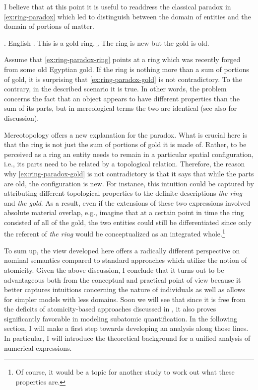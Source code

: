 	I believe that at this point it is useful to readdress the classical paradox in \ref{ex:ring-paradox} which led \citeauthor{link1983logical} to distinguish between the domain of entities and the domain of portions of matter.
	
	\ex. English \citep[adapted]{link1983logical}\label{ex:ring-paradox}
	\a. This is a gold ring.\label{ex:ring-paradox-ring}
	\b. The ring is new but the gold is old.\label{ex:ring-paradox-gold}
	
	 Assume that \ref{ex:ring-paradox-ring} points at a ring which was recently forged from some old Egyptian gold. If the ring is nothing more than a sum of portions of gold, it is surprising that \ref{ex:ring-paradox-gold} is not contradictory. To the contrary, in the described scenario it is true. In other words, the problem concerns the fact that an object appears to have different properties than the sum of its parts, but in mereological terms the two are identical (see also \citealt{rothstein2010counting,rothstein2017semantics} for discussion).
	
	Mereotopology offers a new explanation for the paradox. What is crucial here is that the ring is not just the sum of portions of gold it is made of. Rather, to be perceived as a ring an entity needs to remain in a particular spatial configuration, i.e., its parts need to be related by a topological relation. Therefore, the reason why \ref{ex:ring-paradox-gold} is not contradictory is that it says that while the parts are old, the configuration is new. For instance, this intuition could be captured by attributing different topological properties to the definite descriptions \textit{the ring} and \textit{the gold}. As a result, even if the extensions of these two expressions involved absolute material overlap, e.g., imagine that at a certain point in time the ring consisted of all of the gold, the two entities could still be differentiated since only the referent of \textit{the ring} would be conceptualized as an integrated whole.\footnote{Of course, it would be a topic for another study to work out what these properties are.}
	
	To sum up, the view developed here offers a radically different perspective on nominal semantics compared to standard approaches which utilize the notion of atomicity. Given the above discussion, I conclude that it turns out to be advantageous both from the conceptual and practical point of view because it better captures intuitions concerning the nature of individuals as well as allows for simpler models with less domains. Soon we will see that since it is free from the deficits of atomicity-based approaches discussed in  , it also proves significantly favorable in modeling subatomic quantification. In the following section, I will make a first step towards developing an analysis along those lines. In particular, I will introduce the theoretical background for a unified analysis of numerical expressions.  
	
